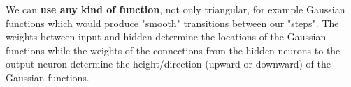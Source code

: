 \documentclass[11pt]{article}
\begin{document}
		We can \textbf{use any kind of function}, not only triangular, for example Gaussian functions which would produce "smooth" transitions between our "steps". The weights between input and hidden determine the locations of the Gaussian functions while the weights of the connections from the hidden neurons to the output neuron determine the height/direction (upward or downward) of the Gaussian functions.
		
		
		
		
		
	
\end{document}
